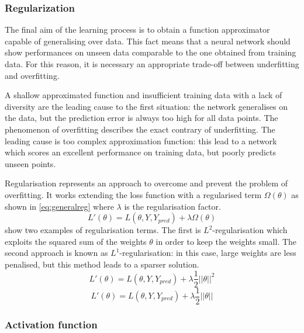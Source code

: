 \subsubsection{Regularization}

The final aim of the learning process is to obtain a function approximator capable of generalising over data. This fact means that a neural network should show performances on unseen data comparable to the one obtained from training data. For this reason, it is necessary an appropriate trade-off between underfitting and overfitting.

A shallow approximated function and insufficient training data with a lack of diversity are the leading cause to the first situation: the network generalises on the data, but the prediction error is always too high for all data points.
The phenomenon of overfitting describes the exact contrary of underfitting. The leading cause is too complex approximation function: this lead to a network which scores an excellent performance on training data, but poorly predicts unseen points.

Regularisation \cite{bishop2006pattern,lecun2015deep} represents an approach to overcome and prevent the problem of overfitting. It works extending the loss function with a regularised term $\Omega(\theta)$ as shown in \vref{eq:generalreg} where $\lambda$ is the regularisation factor. 
\begin{equation}\label{eq:generalreg}
L'(\theta) = L(\theta, Y, Y_{pred}) + \lambda \Omega(\theta)
\end{equation}
 show two examples of regularisation terms. The first is $L^2$-regularisation which exploits the squared sum of the weights $\theta$ in order to keep the weights small. The second approach is known as $L^1$-regularisation: in this case, large weights are less penalised, but this method leads to a sparser solution.
\begin{equation}\label{eq:l2reg}
L'(\theta) = L(\theta, Y, Y_{pred}) + \lambda \frac{1}{2}||\theta||^2 
\end{equation}
\begin{equation}\label{eq:l1reg}
L'(\theta) = L(\theta, Y, Y_{pred}) + \lambda \frac{1}{2}||\theta|| 
\end{equation}


\subsubsection{Activation function}

